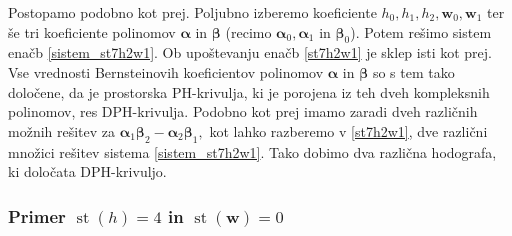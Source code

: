 \documentclass[12pt,a4paper,twoside]{article}
\theoremstyle{definition} %
\theoremstyle{plain} %
\theoremstyle{primerstyle}
\numberwithin{equation}{section}  %
\newcommand{\wV}{\mathbf{w}}
\newcommand{\balpha}{\boldsymbol \alpha}
\newcommand{\bbeta}{\boldsymbol \beta}
\DeclareMathOperator{\st}{st}
\begin{document}
Postopamo podobno kot prej. Poljubno izberemo koeficiente $h_0,h_1,h_2,\wV_0,\wV_1$ ter še tri koeficiente polinomov $\balpha$ in $\bbeta$ (recimo $\balpha_0,\balpha_1$ in $\bbeta_0$). Potem rešimo sistem enačb \eqref{sistem_st7h2w1}. Ob upoštevanju enačb \eqref{st7h2w1} je sklep isti kot prej. Vse vrednosti Bernsteinovih koeficientov polinomov $\balpha$ in $\bbeta$ so s tem tako določene, da je prostorska PH-krivulja, ki je porojena iz teh dveh kompleksnih polinomov, res DPH-krivulja. Podobno kot prej imamo zaradi dveh različnih možnih rešitev za $\balpha_1\bbeta_2-\balpha_2\bbeta_1,$ kot lahko razberemo v \eqref{st7h2w1}, dve različni množici rešitev sistema \eqref{sistem_st7h2w1}. Tako dobimo dva različna hodografa, ki določata DPH-krivuljo.

\subsubsection{Primer \texorpdfstring{$\st(h)=4$}{st(h)=4} in \texorpdfstring{$\st(\wV)=0$}{st(w)=0}}
\label{klasifikacija_h4w0}
\end{document}
